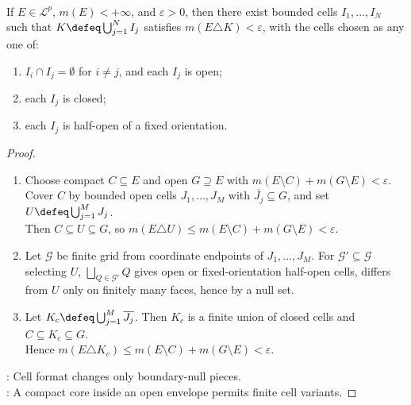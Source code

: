 \begin{corollary} \label{cor:cell-approximation-variant-choices} \\
If $E\in\mathcal{L}^p$, $m(E)<+\infty$, and $\varepsilon>0$, then there exist bounded cells $I_1,\ldots,I_N$ such that $K\defeq\bigcup_{j=1}^{N}I_j$ satisfies $m(E\triangle K)<\varepsilon$, with the cells chosen as any one of:
\begin{enumerate}[label=(\roman*)]
\setlength{\itemsep}{0pt}
\item $I_i\cap I_j=\emptyset$ for $i\neq j$, and each $I_j$ is open;
\item each $I_j$ is closed;
\item each $I_j$ is half-open of a fixed orientation.
\end{enumerate}
\begin{proof}
\begin{enumerate}[label=(\roman*)]
\setlength{\itemsep}{0pt}
\item Choose compact $C\subseteq E$ and open $G\supseteq E$ with $m(E\setminus C)+m(G\setminus E)<\varepsilon$.\\
Cover $C$ by bounded open cells $J_1,\ldots,J_M$ with $\overline{J_j}\subseteq G$, and set $U\defeq\bigcup_{j=1}^{M}J_j$.\\
Then $C\subseteq U\subseteq G$, so $m(E\triangle U)\leq m(E\setminus C)+m(G\setminus E)<\varepsilon$.
\item Let $\mathcal{G}$ be finite grid from coordinate endpoints of $J_1,\ldots,J_M$. For $\mathcal{G}'\subseteq\mathcal{G}$ selecting $U$, $\bigsqcup_{Q\in\mathcal{G}'}Q$ gives open or fixed-orientation half-open cells, differs from $U$ only on finitely many faces, hence by a null set.
\item Let $K_c\defeq\bigcup_{j=1}^{M}\overline{J_j}$. Then $K_c$ is a finite union of closed cells and $C\subseteq K_c\subseteq G$.\\
Hence $m(E\triangle K_c)\leq m(E\setminus C)+m(G\setminus E)<\varepsilon$.
\end{enumerate}
: Cell format changes only boundary-null pieces.\\
: A compact core inside an open envelope permits finite cell variants.
\end{proof}
\end{corollary}

